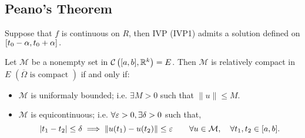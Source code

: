 \subsection{Peano's Theorem}
\begin{theorem}[Peano]
Suppose that $f $ is continuous on $R $, then IVP (IVP1) admits a solution defined 
on $\left[ t_0 - \alpha, t_0 + \alpha \right].$
\end{theorem}
\begin{theorem}
Let $\mathcal{M}  $ be a nonempty set in $\mathcal{C} \left( [a,b] , \mathbb{R} ^k  \right) = E$. Then $\mathcal{M}  $ is
relatively compact in $E$ $(\overline{\Omega } \text{ is compact })$ if and only if:  
\begin{itemize}
  \item[\ding{172}] $\mathcal{M}  $ is uniformaly bounded; i.e. $\exists M > 0$ such that $\| u \|  \leq  M.$ 
 \item[\ding{173}] $\mathcal{M}  $ is equicontinuous; i.e. $\forall \varepsilon  > 0, \exists \delta  > 0$ such that,
    \[
    \left| t_1-t_2 \right|  \leq \delta  \implies 
    \| u(t_1) - u(t_2)  \| \leq  \varepsilon  \quad \quad 
    \forall u \in  \mathcal{M}, \quad 
    \forall t_1, t_2 \in   [a,b] .
    \]
\end{itemize}
\end{theorem}
